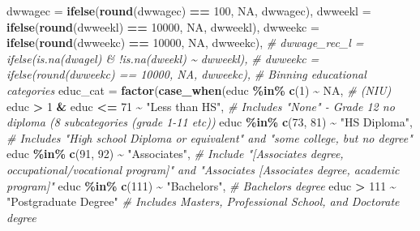 \documentclass[
]{article}
\newenvironment{Shaded}{\begin{snugshade}}{\end{snugshade}}
\newcommand{\AttributeTok}[1]{\textcolor[rgb]{0.13,0.29,0.53}{#1}}
\newcommand{\CommentTok}[1]{\textcolor[rgb]{0.56,0.35,0.01}{\textit{#1}}}
\newcommand{\ConstantTok}[1]{\textcolor[rgb]{0.56,0.35,0.01}{#1}}
\newcommand{\DecValTok}[1]{\textcolor[rgb]{0.00,0.00,0.81}{#1}}
\newcommand{\FunctionTok}[1]{\textcolor[rgb]{0.13,0.29,0.53}{\textbf{#1}}}
\newcommand{\NormalTok}[1]{#1}
\newcommand{\SpecialCharTok}[1]{\textcolor[rgb]{0.81,0.36,0.00}{\textbf{#1}}}
\newcommand{\StringTok}[1]{\textcolor[rgb]{0.31,0.60,0.02}{#1}}
\begin{document}
\begin{Shaded}
\begin{Highlighting}[]
         \AttributeTok{dwwagec =} \FunctionTok{ifelse}\NormalTok{(}\FunctionTok{round}\NormalTok{(dwwagec) }\SpecialCharTok{==} \DecValTok{100}\NormalTok{, }\ConstantTok{NA}\NormalTok{, dwwagec),}
         \AttributeTok{dwweekl =} \FunctionTok{ifelse}\NormalTok{(}\FunctionTok{round}\NormalTok{(dwweekl) }\SpecialCharTok{==} \DecValTok{10000}\NormalTok{, }\ConstantTok{NA}\NormalTok{, dwweekl),}
         \AttributeTok{dwweekc =} \FunctionTok{ifelse}\NormalTok{(}\FunctionTok{round}\NormalTok{(dwweekc) }\SpecialCharTok{==} \DecValTok{10000}\NormalTok{, }\ConstantTok{NA}\NormalTok{, dwweekc),}
         \CommentTok{\# dwwage\_rec\_l = ifelse(is.na(dwagel) \& !is.na(dweekl) \textasciitilde{} dwweekl),}
         \CommentTok{\# dwweekc = ifelse(round(dwweekc) == 10000, NA, dwweekc),}
         \CommentTok{\# Binning educational categories}
         \AttributeTok{educ\_cat =} \FunctionTok{factor}\NormalTok{(}\FunctionTok{case\_when}\NormalTok{(educ }\SpecialCharTok{\%in\%} \FunctionTok{c}\NormalTok{(}\DecValTok{1}\NormalTok{) }\SpecialCharTok{\textasciitilde{}} \ConstantTok{NA}\NormalTok{, }\CommentTok{\# (NIU)}
\NormalTok{                              educ }\SpecialCharTok{\textgreater{}} \DecValTok{1} \SpecialCharTok{\&}\NormalTok{ educ }\SpecialCharTok{\textless{}=} \DecValTok{71} \SpecialCharTok{\textasciitilde{}} \StringTok{"Less than HS"}\NormalTok{, }\CommentTok{\# Includes "None" {-} Grade 12 no diploma (8 subcategories (grade 1{-}11 etc))}
\NormalTok{                              educ }\SpecialCharTok{\%in\%} \FunctionTok{c}\NormalTok{(}\DecValTok{73}\NormalTok{, }\DecValTok{81}\NormalTok{) }\SpecialCharTok{\textasciitilde{}} \StringTok{"HS Diploma"}\NormalTok{, }\CommentTok{\# Includes "High school Diploma or equivalent" and "some college, but no degree"}
\NormalTok{                              educ }\SpecialCharTok{\%in\%} \FunctionTok{c}\NormalTok{(}\DecValTok{91}\NormalTok{, }\DecValTok{92}\NormalTok{) }\SpecialCharTok{\textasciitilde{}} \StringTok{"Associate\textquotesingle{}s"}\NormalTok{, }\CommentTok{\# Include "[Associate\textquotesingle{}s degree, occupational/vocational program]" and "Associate\textquotesingle{}s         [Associate\textquotesingle{}s degree, academic program]"}
\NormalTok{                              educ }\SpecialCharTok{\%in\%} \FunctionTok{c}\NormalTok{(}\DecValTok{111}\NormalTok{) }\SpecialCharTok{\textasciitilde{}} \StringTok{"Bachelor\textquotesingle{}s"}\NormalTok{, }\CommentTok{\# Bachelor\textquotesingle{}s degree}
\NormalTok{                              educ }\SpecialCharTok{\textgreater{}} \DecValTok{111} \SpecialCharTok{\textasciitilde{}} \StringTok{"Postgraduate Degree"} \CommentTok{\# Includes Master\textquotesingle{}s, Professional School, and Doctorate degree}

\end{Highlighting}
\end{Shaded}
\end{document}
